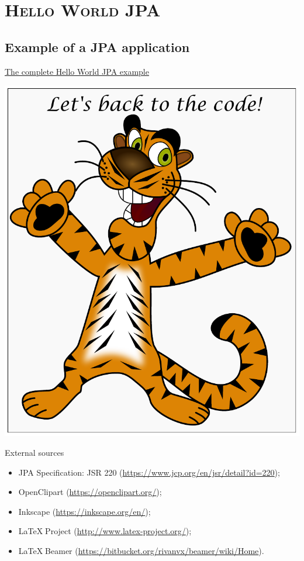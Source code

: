 \documentclass[xcolor=x11names,compress]{beamer}
\renewcommand{\(}{\begin{columns}}
\renewcommand{\)}{\end{columns}}
\newcommand{\<}[1]{\begin{column}{#1}}
\renewcommand{\>}{\end{column}}
\begin{document}
\section{\scshape Hello World JPA}
\subsection{Example of a JPA application}
\begin{frame}{\underline{The complete Hello World JPA example}}

\begin{center}
\includegraphics[keepaspectratio,width=.4\textwidth]{Happy-Tiger-Hello}
\end{center}
\end{frame}

\begin{frame}[noframenumbering]{External sources}

\begin{itemize}
\itemsep 12pt
\justifying

\item JPA Specification: JSR 220 (\url{https://www.jcp.org/en/jsr/detail?id=220});

\item OpenClipart (\url{https://openclipart.org/});

\item Inkscape (\url{https://inkscape.org/en/});

\item \LaTeX $\;$Project (\url{http://www.latex-project.org/});

\item \LaTeX $\;$Beamer (\url{https://bitbucket.org/rivanvx/beamer/wiki/Home}).

\end{itemize}




\end{frame}
\end{document}
